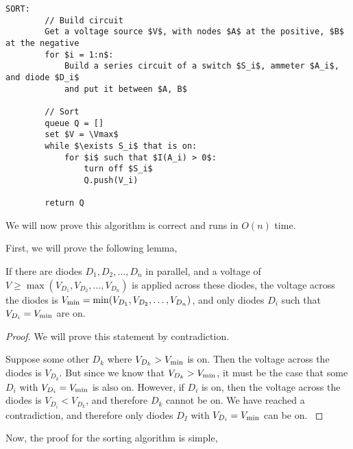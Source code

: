 \documentclass{article}
\begin{document}
\begin{lstlisting}[label={alg:sort}]
	SORT:
		// Build circuit
		Get a voltage source $V$, with nodes $A$ at the positive, $B$ at the negative
		for $i = 1:n$:
			Build a series circuit of a switch $S_i$, ammeter $A_i$, and diode $D_i$
			and put it between $A, B$

		// Sort
		queue Q = []
		set $V = \Vmax$
		while $\exists S_i$ that is on:
			for $i$ such that $I(A_i) > 0$:
				turn off $S_i$
				Q.push(V_i)

		return Q
\end{lstlisting}

We will now prove this algorithm is correct and runs in $O(n)$ time.

First, we will prove the following lemma,

\begin{lemma}
	If there are diodes $D_1, D_2, \dots, D_n$ in parallel, and a voltage of $V
	\geq \max(V_{D_1}, V_{D_2}, \dots, V_{D_n})$ is applied across these diodes,
	the voltage across the diodes is $V_\text{min} = \min(V_{D_1}, V_{D_2}, \dots, V_{D_n})$,
	and only diodes $D_i$ such that $V_{D_i} = V_\text{min}$ are on.
\end{lemma}

\begin{proof}
	We will prove this statement by contradiction.

	Suppose some other $D_k$ where $V_{D_k} > V_\text{min}$ is on. Then the voltage
	across the diodes is $V_{D_k}$. But since we know that $V_{D_k} >
	V_\text{min}$, it must be the case that some $D_i$ with $V_{D_i} = V_\text{min}$ is also
	on. However, if $D_i$ is on, then the voltage across the diodes is $V_{D_i}
	< V_{D_k}$, and therefore $D_k$ cannot be on. We have reached a
	contradiction, and therefore only diodes $D_I$ with $V_{D_i} = V_\text{min}$ can
	be on.
	\label{lemma:smallest_diode}
\end{proof}

Now, the proof for the sorting algorithm is simple,
\end{document}
